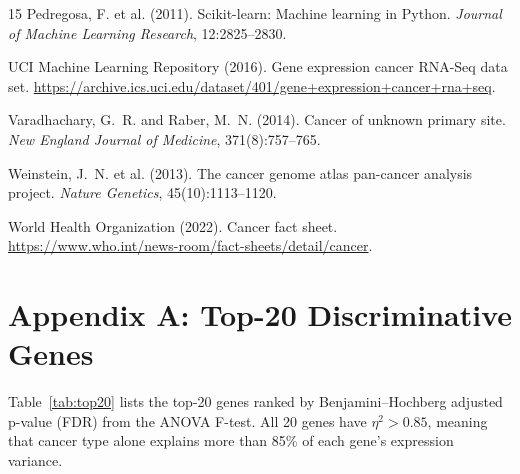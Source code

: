 \documentclass{article}
\begin{document}
\begin{thebibliography}{15}
Pedregosa, F. et al. (2011).
\newblock Scikit-learn: Machine learning in {P}ython.
\newblock \emph{Journal of Machine Learning Research}, 12:2825--2830.

{UCI Machine Learning Repository} (2016).
\newblock Gene expression cancer {RNA-Seq} data set.
\newblock \url{https://archive.ics.uci.edu/dataset/401/gene+expression+cancer+rna+seq}.

Varadhachary, G.~R. and Raber, M.~N. (2014).
\newblock Cancer of unknown primary site.
\newblock \emph{New England Journal of Medicine}, 371(8):757--765.

Weinstein, J.~N. et al. (2013).
\newblock The cancer genome atlas pan-cancer analysis project.
\newblock \emph{Nature Genetics}, 45(10):1113--1120.

{World Health Organization} (2022).
\newblock Cancer fact sheet.
\newblock \url{https://www.who.int/news-room/fact-sheets/detail/cancer}.

\end{thebibliography}

\appendix
\section{Appendix A: Top-20 Discriminative Genes}
Table~\ref{tab:top20} lists the top-20 genes ranked by Benjamini--Hochberg adjusted p-value (FDR) from the ANOVA F-test. All 20 genes have $\eta^2 > 0.85$, meaning that cancer type alone explains more than 85\% of each gene's expression variance.
\end{document}
